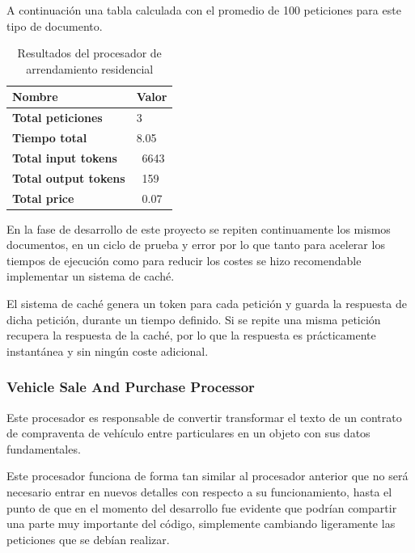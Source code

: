 A continuación una tabla calculada con el promedio de 100 peticiones para este tipo de documento.

\begin{table}[h]
    \renewcommand{\arraystretch}{1.5}
    \setlength{\tabcolsep}{10pt}
    \begin{tabular}{>{\bfseries}p{} p{}}
        \toprule
        \textbf{Nombre}     & \textbf{Valor} \\
        \midrule
        Total peticiones    & 3              \\
        Tiempo total        & 8.05           \\
        Total input tokens  & ~6643          \\
        Total output tokens & ~159           \\
        Total price         & ~0.07          \\
        \bottomrule
    \end{tabular}
    \caption{Resultados del procesador de arrendamiento residencial}
    \label{tab:residential_lease_processor}
\end{table}

En la fase de desarrollo de este proyecto se repiten continuamente los mismos documentos, en un ciclo de prueba y error
por lo que tanto para acelerar los tiempos de ejecución como para reducir los costes se hizo recomendable implementar
un sistema de caché.

El sistema de caché genera un token para cada petición y guarda la respuesta de dicha petición, durante un tiempo
definido.
Si se repite una misma petición recupera la respuesta de la caché, por lo que la respuesta es prácticamente
instantánea y sin ningún coste adicional.

\subsubsection{Vehicle Sale And Purchase Processor}

Este procesador es responsable de convertir transformar el texto de un contrato de compraventa de vehículo entre
particulares en un objeto con sus datos fundamentales.

Este procesador funciona de forma tan similar al procesador anterior que no será necesario entrar en nuevos detalles
con respecto a su funcionamiento, hasta el punto de que en el momento del desarrollo fue evidente que podrían
compartir una parte muy importante del código, simplemente cambiando ligeramente las peticiones que se debían realizar.

